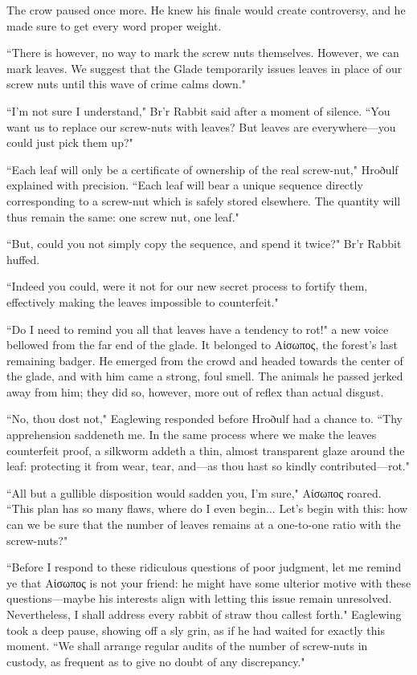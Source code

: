 The crow paused once more.
He knew his finale would create controversy, and he made sure to get every word proper weight.

``There is however, no way to mark the screw nuts themselves.
However, we can mark leaves.
We suggest that the Glade temporarily issues leaves in place of our screw nuts until this wave of crime calms down."

``I'm not sure I understand," Br'r Rabbit said after a moment of silence.
``You want us to replace our screw-nuts with leaves?
But leaves are everywhere---you could just pick them up?"

``Each leaf will only be a certificate of ownership of the real screw-nut," Hroðulf explained with precision.
``Each leaf will bear a unique sequence directly corresponding to a screw-nut which is safely stored elsewhere.
The quantity will thus remain the same: one screw nut, one leaf."

``But, could you not simply copy the sequence, and spend it twice?" Br'r Rabbit huffed.

``Indeed you could, were it not for our new secret process to fortify them, effectively making the leaves impossible to counterfeit."

``Do I need to remind you all that leaves have a tendency to rot!" a new voice bellowed from the far end of the glade.
It belonged to Αίσωπος, the forest's last remaining badger.
He emerged from the crowd and headed towards the center of the glade, and with him came a strong, foul smell.
The animals he passed jerked away from him; they did so, however, more out of reflex than actual disgust.

``No, thou dost not," Eaglewing responded before Hroðulf had a chance to.
``Thy apprehension saddeneth me.
In the same process where we make the leaves counterfeit proof, a silkworm addeth a thin, almost transparent glaze around the leaf: protecting it from wear, tear, and---as thou hast so kindly contributed---rot."

``All but a gullible disposition would sadden you, I'm sure," Αίσωπος roared.
``This plan has so many flaws, where do I even begin... Let's begin with this: how can we be sure that the number of leaves remains at a one-to-one ratio with the screw-nuts?"

``Before I respond to these ridiculous questions of poor judgment, let
me remind ye that Αίσωπος is not your friend: he might have some ulterior motive with these questions---maybe his interests align with letting this issue remain unresolved.
Nevertheless, I shall address every rabbit of straw thou callest forth." Eaglewing took a deep pause, showing off a sly grin, as if he had waited for exactly this moment.
``We shall arrange regular audits of the number of screw-nuts in custody, as frequent as to give no doubt of any discrepancy."


